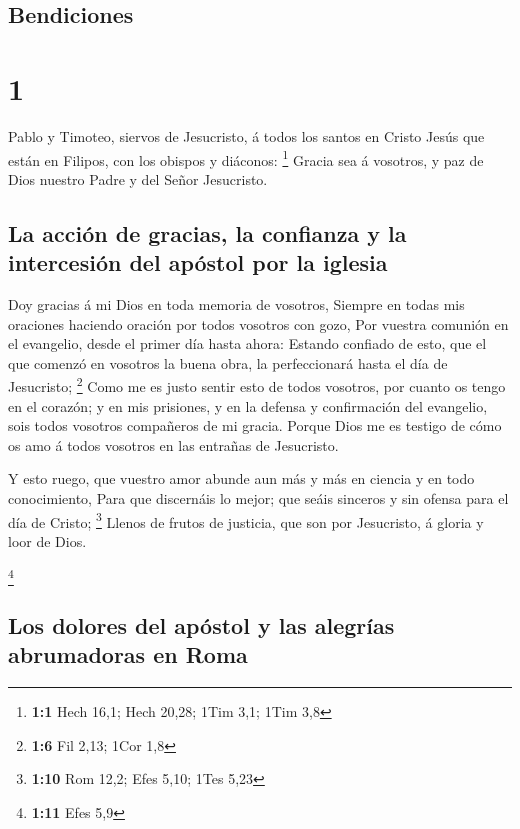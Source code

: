 \hypertarget{bendiciones}{%
\subsection{Bendiciones}\label{bendiciones}}

\hypertarget{section}{%
\section{1}\label{section}}

 Pablo y Timoteo, siervos de Jesucristo, á todos los
santos en Cristo Jesús que están en Filipos, con los obispos y diáconos:
\footnote{\textbf{1:1} Hech 16,1; Hech 20,28; 1Tim 3,1; 1Tim 3,8}
 Gracia sea á vosotros, y paz de Dios nuestro Padre y del
Señor Jesucristo.

\hypertarget{la-acciuxf3n-de-gracias-la-confianza-y-la-intercesiuxf3n-del-apuxf3stol-por-la-iglesia}{%
\subsection{La acción de gracias, la confianza y la intercesión del
apóstol por la
iglesia}\label{la-acciuxf3n-de-gracias-la-confianza-y-la-intercesiuxf3n-del-apuxf3stol-por-la-iglesia}}

 Doy gracias á mi Dios en toda memoria de vosotros,
 Siempre en todas mis oraciones haciendo oración por todos
vosotros con gozo,  Por vuestra comunión en el evangelio,
desde el primer día hasta ahora:  Estando confiado de
esto, que el que comenzó en vosotros la buena obra, la perfeccionará
hasta el día de Jesucristo; \footnote{\textbf{1:6} Fil 2,13; 1Cor 1,8}
 Como me es justo sentir esto de todos vosotros, por
cuanto os tengo en el corazón; y en mis prisiones, y en la defensa y
confirmación del evangelio, sois todos vosotros compañeros de mi gracia.
 Porque Dios me es testigo de cómo os amo á todos vosotros
en las entrañas de Jesucristo.

 Y esto ruego, que vuestro amor abunde aun más y más en
ciencia y en todo conocimiento,  Para que discernáis lo
mejor; que seáis sinceros y sin ofensa para el día de Cristo;
\footnote{\textbf{1:10} Rom 12,2; Efes 5,10; 1Tes 5,23} 
Llenos de frutos de justicia, que son por Jesucristo, á gloria y loor de
Dios.

\footnote{\textbf{1:11} Efes 5,9}

\hypertarget{los-dolores-del-apuxf3stol-y-las-alegruxedas-abrumadoras-en-roma}{%
\subsection{Los dolores del apóstol y las alegrías abrumadoras en
Roma}\label{los-dolores-del-apuxf3stol-y-las-alegruxedas-abrumadoras-en-roma}}

